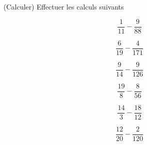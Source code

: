  (Calculer) Effectuer les calculs suivants

\begin{multicols}{6}
$$\dfrac{1}{11}-\dfrac{9}{88}$$

$$\dfrac{6}{19}-\dfrac{4}{171}$$

$$\dfrac{9}{14}-\dfrac{9}{126}$$

$$\dfrac{19}{8}-\dfrac{8}{56}$$

$$\dfrac{14}{3}-\dfrac{18}{12}$$

$$\dfrac{12}{20}-\dfrac{2}{120}$$

\end{multicols}